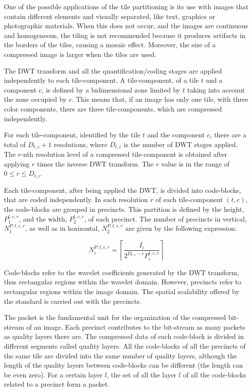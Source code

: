 One of the possible applications of the tile partitioning is its use
with images that contain different elements and visually separated,
like text, graphics or photographic materials. When this does not
occur, and the images are continuous and homogeneous, the tiling
is not recommended because it produces artifacts in the borders of
the tiles, causing a mosaic effect. Moreover, the size of a
compressed image is larger when the tiles are used.

The DWT transform and all the quantification/coding stages
are applied independently to each tile-component. A tile-component,
of a tile $t$ and a component $c$, is defined by a bidimensional
zone limited by $t$ taking into account the zone occupied by
$c$. This means that, if an
image has only one tile, with three color components, there are
three tile-components, which are compressed independently.

For each tile-component, identified by the tile $t$ and the component
$c$, there are a total of $D_{t,c} + 1$
resolutions, where $D_{t,c}$ is the number
of DWT stages applied. The $r$-nth resolution level of a compressed
tile-component is obtained after applying $r$ times the inverse DWT
transform. The
$r$ value is in the range of $0 \leq r \leq D_{t,c}$. 

Each tile-component, after being applied the DWT, is 
divided into code-blocks, that are coded independently. 
In each resolution $r$ of each tile-component $(t,c)$, the
code-blocks are grouped in precincts. This partition is
defined by the height, $P_{1}^{t,c,r}$,
and the width, $P_{2}^{t,c,r}$,
of each precinct. The number of precincts in vertical, 
$N_{1}^{P,t,c,r}$, 
as well as in horizontal, $N_{2}^{P,t,c,r}$ are given by
the following expression:

\begin{equation*}
N_{i}^{P,t,c,r} = \left\lceil \frac{I_{i}}{2^{D_{t,c}-r}P_{i}^{t,c,r}} \right\rceil
\end{equation*}

Code-blocks refer to the wavelet coefficients generated by the DWT
transform, thus rectangular regions within the wavelet
domain. However, precincts refer to rectangular regions within the
image domain. The spatial scalability offered by the standard is
carried out with the precincts.  

The packet is the fundamental unit for the organization
of the compressed bit-stream of an image. Each precinct contributes
to the bit-stream as many packets as quality layers there are. The
compressed data of each code-block is divided in different segments
called quality layers. All the code-blocks of all the precincts
of the same tile are divided into the same number of quality layers,
although the length of the quality layers between code-blocks can be
different (the length can be even zero). For a certain layer $l$,
the set of all the layer $l$ of all the code-blocks related to a
precinct form a packet.

